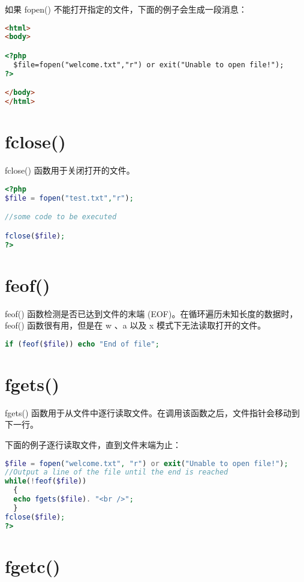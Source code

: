 如果 fopen() 不能打开指定的文件，下面的例子会生成一段消息：


\begin{lstlisting}[language=HTML]
<html>
<body>

<?php
  $file=fopen("welcome.txt","r") or exit("Unable to open file!");
?>

</body>
</html>
\end{lstlisting}



\section{fclose()}

fclose() 函数用于关闭打开的文件。

\begin{lstlisting}[language=PHP]
<?php
$file = fopen("test.txt","r");

//some code to be executed

fclose($file);
?>
\end{lstlisting}


\section{feof()}


feof() 函数检测是否已达到文件的末端 (EOF)。在循环遍历未知长度的数据时，feof() 函数很有用，但是在 w 、a 以及 x 模式下无法读取打开的文件。


\begin{lstlisting}[language=PHP]
if (feof($file)) echo "End of file";
\end{lstlisting}



\section{fgets()}


fgets() 函数用于从文件中逐行读取文件。在调用该函数之后，文件指针会移动到下一行。

下面的例子逐行读取文件，直到文件末端为止：


\begin{lstlisting}[language=PHP]
$file = fopen("welcome.txt", "r") or exit("Unable to open file!");
//Output a line of the file until the end is reached
while(!feof($file))
  {
  echo fgets($file). "<br />";
  }
fclose($file);
?>
\end{lstlisting}


\section{fgetc()}


